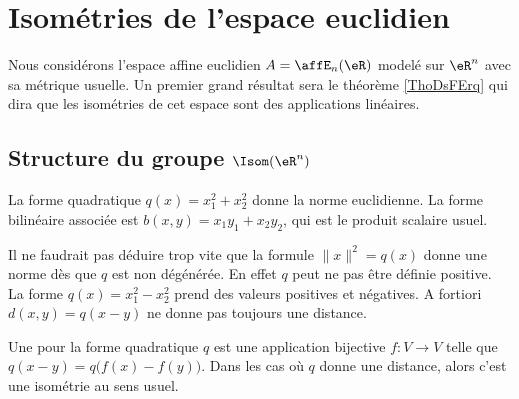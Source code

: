 
\section{Isométries de l'espace euclidien}

Nous considérons l'espace affine euclidien \( A=\affE_n(\eR)\) modelé sur \( \eR^n\) avec sa métrique usuelle. Un premier grand résultat sera le théorème \ref{ThoDsFErq} qui dira que les isométries de cet espace sont des applications linéaires.

\subsection{Structure du groupe  \texorpdfstring{\( \Isom(\eR^n)\)}{Isom(Rn)} }

\begin{example}
    La forme quadratique \( q(x)=x_1^2+x_2^2\) donne la norme euclidienne. La forme bilinéaire associée est \( b(x,y)=x_1y_1+x_2y_2\), qui est le produit scalaire usuel.
\end{example}

Il ne faudrait pas déduire trop vite que la formule \( \| x \|^2=q(x)\) donne une norme dès que \( q\) est non dégénérée. En effet \( q\) peut ne pas être définie positive. La forme \( q(x)=x_1^2-x_2^2\) prend des valeurs positives et négatives. A fortiori \( d(x,y)=q(x-y)\) ne donne pas toujours une distance.

\begin{definition}      \label{DEFooECTUooRxBhHf}
    Une  pour la forme quadratique \( q\) est une application bijective \( f\colon V\to V\) telle que \( q(x-y)=q\big( f(x)-f(y) \big)\). Dans les cas où \( q\) donne une distance, alors c'est une isométrie au sens usuel.
\end{definition}

